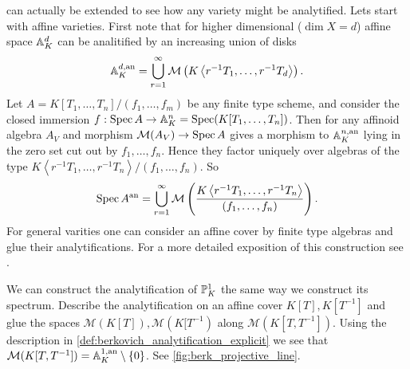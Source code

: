 \begin{example}
	 can actually be extended to see how any variety might be analytified. 
	Lets start with affine varieties. 
	First note that for higher dimensional ($\dim X = d$) affine space $\mathbb{A}_K^{d}$ can be analitified by an increasing union of disks \[
		\mathbb{A}_K^{d, \text{an}} = \bigcup_{r = 1} ^{\infty} \mathcal{M} \left(K \left<r^{-1} T_1, \ldots, r^{-1} T_d \right>\right)
	.\] 
	Let $A = K[T_1,\ldots, T_n] / (f_1, \ldots, f_m)$ be any finite type scheme, and consider the closed immersion $f: \operatorname{Spec} A \to \mathbb{A}_K^{n} = \operatorname{Spec} (K[T_1, \ldots, T_n]) $. 
	Then for any affinoid algebra $A_V$ and morphism $\mathcal{M} (A_V) \to \operatorname{Spec} A$ gives a morphism to $\mathbb{A}_K^{n, \text{an}}$ lying in the zero set cut out by $f_1, \ldots, f_n$. Hence they factor uniquely over algebras of the type $K \left<r^{-1} T_1, \ldots, r^{-1} T_n \right>/ (f_1, \ldots, f_n)$. 
	So \[
		\operatorname{Spec} A {}^{\text{an}} = \bigcup_{r= 1} ^{\infty} \mathcal{M} \left(\frac{K \left<r^{-1} T_1, \ldots, r^{-1} T_n \right>}{(f_1, \ldots, f_n)}\right)
	.\] 
	For general varities one can consider an affine cover by finite type algebras and glue their analytifications. 
	For a more detailed exposition of this construction see \cite{berkovichSpectralTheoryAnalytic2012}. 
\end{example}

\begin{example}
	We can construct the analytification of $\mathbb{P}^{1}_K$ the same way we construct its spectrum. 
Describe the analytification on an affine cover $K[T], K[T^{-1}]$ and glue the spaces $\mathcal{M} (K[T]), \mathcal{M} (K[T^{-1})$ along $\mathcal{M} (K[T, T^{-1}])$. 
Using the description in \cref{def:berkovich_analytification_explicit} we see that $\mathcal{M} (K[T, T^{-1}]) = \mathbb{A}^{1, \text{an}}_K \setminus \{0\} $.
See \cref{fig:berk_projective_line}. 
\end{example}

